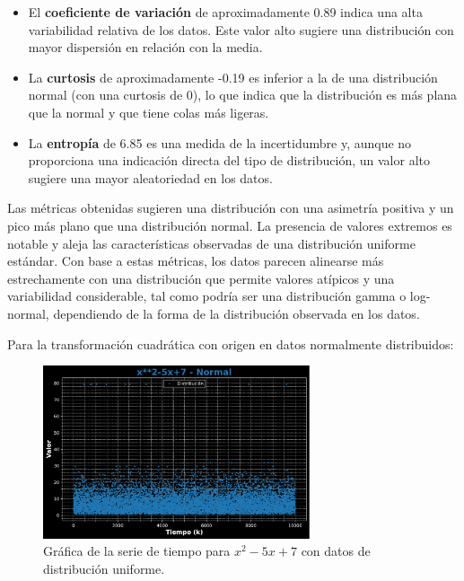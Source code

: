\documentclass[11pt]{article} %
\begin{document}
\begin{itemize}
		\item El \textbf{coeficiente de variación} de aproximadamente 0.89 indica una alta variabilidad relativa de los datos. Este valor alto sugiere una distribución con mayor dispersión en relación con la media.
		
		\item La \textbf{curtosis} de aproximadamente -0.19 es inferior a la de una distribución normal (con una curtosis de 0), lo que indica que la distribución es más plana que la normal y que tiene colas más ligeras.
		
		\item La \textbf{entropía} de 6.85 es una medida de la incertidumbre y, aunque no proporciona una indicación directa del tipo de distribución, un valor alto sugiere una mayor aleatoriedad en los datos.
	\end{itemize}
	
	Las métricas obtenidas sugieren una distribución con una asimetría positiva y un pico más plano que una distribución normal. La presencia de valores extremos es notable y aleja las características observadas de una distribución uniforme estándar. Con base a estas métricas, los datos parecen alinearse más estrechamente con una distribución que permite valores atípicos y una variabilidad considerable, tal como podría ser una distribución gamma o log-normal, dependiendo de la forma de la distribución observada en los datos.
	
	\newpage
	
	Para la transformación cuadrática con origen en datos normalmente distribuidos:
	\begin{figure}[h]
		\centering
		\includegraphics[width=0.7\textwidth]{../transformaciones/cuad_normal1.pdf}
		\caption{Gráfica de la serie de tiempo para $x^2 - 5x + 7$ con datos de distribución uniforme.}
		\label{fig:cuadNormGraf}
	\end{figure}
	
\end{document}
